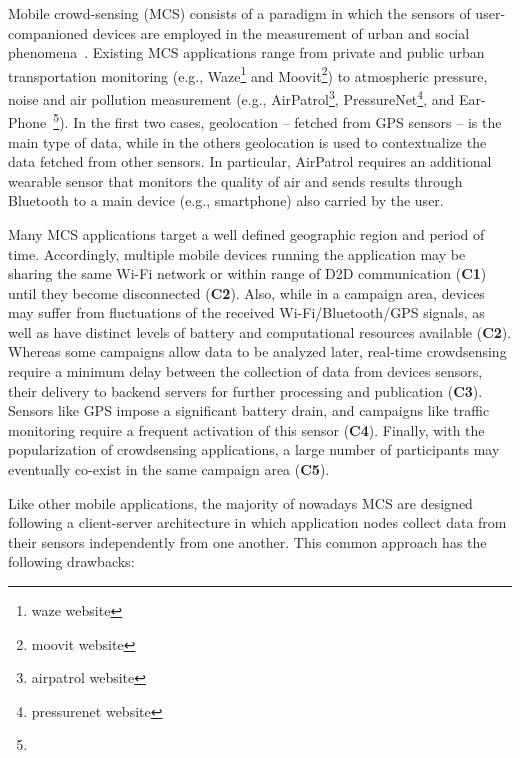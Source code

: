 Mobile crowd-sensing (MCS) consists of a paradigm in which the sensors of user-companioned devices are employed in the measurement of urban and social phenomena~\cite{}. Existing MCS applications range from private and public urban transportation monitoring (e.g., Waze\footnote{waze website} and Moovit\footnote{moovit website}) to atmospheric pressure, noise and air pollution measurement (e.g., AirPatrol\footnote{airpatrol website}, PressureNet\footnote{pressurenet website}, and Ear-Phone~\footnote{}). In the first two cases, geolocation -- fetched from GPS sensors -- is the main type of data, while in the others geolocation is used to contextualize the data fetched from other sensors. In particular, AirPatrol requires an additional wearable sensor that monitors the quality of air and sends results through Bluetooth to a main device (e.g., smartphone) also carried by the user.

Many MCS applications target a well defined geographic region and period of time. Accordingly, multiple mobile devices running the application may be sharing the same Wi-Fi network or within range of D2D communication (\textbf{C1}) until they become disconnected (\textbf{C2}). Also, while in a campaign area, devices may suffer from fluctuations of the received Wi-Fi/Bluetooth/GPS signals, as well as have distinct levels of battery and computational resources available (\textbf{C2}).
Whereas some campaigns allow data to be analyzed later, real-time crowdsensing require a minimum delay between the collection of data from devices sensors, their delivery to backend servers for further processing and publication (\textbf{C3}). Sensors like GPS impose a significant battery drain, and campaigns like traffic monitoring require a frequent activation of this sensor (\textbf{C4}). Finally, with the popularization of crowdsensing applications, a large number of participants may eventually co-exist in the same campaign area (\textbf{C5}). 


Like other mobile applications, the majority of nowadays MCS are designed following a client-server architecture in which application nodes collect data from their sensors independently from one another. 
This common approach has the following drawbacks:

